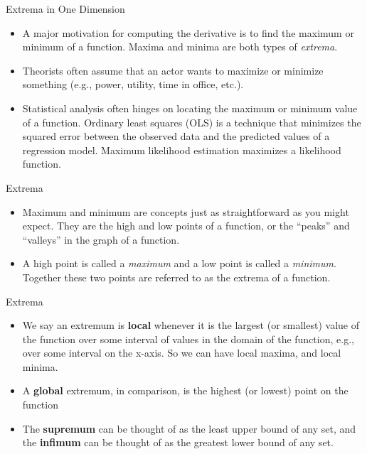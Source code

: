\documentclass[
  ignorenonframetext,
]{beamer}
\begin{document}
\begin{frame}{Extrema in One Dimension}
\protect\hypertarget{extrema-in-one-dimension}{}

\begin{itemize}
\item
  A major motivation for computing the derivative is to find the maximum
  or minimum of a function. Maxima and minima are both types of
  \emph{extrema}.
\item
  Theorists often assume that an actor wants to maximize or minimize
  something (e.g., power, utility, time in office, etc.).
\item
  Statistical analysis often hinges on locating the maximum or minimum
  value of a function. Ordinary least squares (OLS) is a technique that
  minimizes the squared error between the observed data and the
  predicted values of a regression model. Maximum likelihood estimation
  maximizes a likelihood function.
\end{itemize}

\end{frame}

\begin{frame}{Extrema}
\protect\hypertarget{extrema}{}

\begin{itemize}
\item
  Maximum and minimum are concepts just as straightforward as you might
  expect. They are the high and low points of a function, or the
  ``peaks'' and ``valleys'' in the graph of a function.
\item
  A high point is called a \emph{maximum} and a low point is called a
  \emph{minimum}. Together these two points are referred to as the
  extrema of a function.
\end{itemize}

\end{frame}

\begin{frame}{Extrema}
\protect\hypertarget{extrema-1}{}

\begin{itemize}
\item
  We say an extremum is \textbf{local} whenever it is the largest (or
  smallest) value of the function over some interval of values in the
  domain of the function, e.g., over some interval on the x-axis. So we
  can have local maxima, and local minima.
\item
  A \textbf{global} extremum, in comparison, is the highest (or lowest)
  point on the function
\item
  The \textbf{supremum} can be thought of as the least upper bound of
  any set, and the \textbf{infimum} can be thought of as the greatest
  lower bound of any set.
\end{itemize}

\end{frame}
\end{document}
